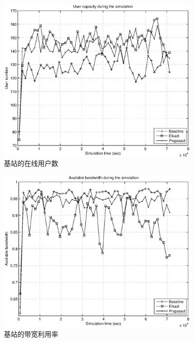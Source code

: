 %
\begin{figure}[htb]
\centering
\includegraphics[width=4in] {clock_onging_call_sum.eps}
\caption{基站的在线用户数}\label{cacop_pic_clock_onging_call_sum}
\end{figure}

% 
\begin{figure}[htb]
\centering
\includegraphics[width=4in] {clock_bs_availble_bw.eps}
\caption{基站的带宽利用率}\label{cacop_pic_clock_bs_availble_bw}
\end{figure}

